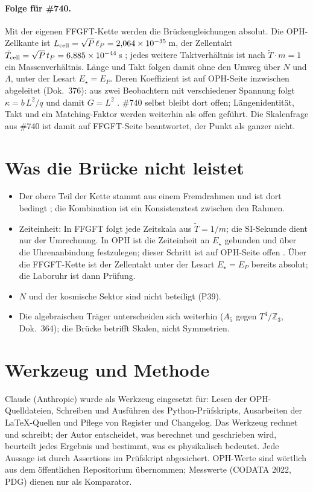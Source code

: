 \paragraph{Folge für \#740.} Mit der eigenen FFGFT-Kette werden die
Brückengleichungen absolut. Die OPH-Zellkante ist
$L_{\rm cell}=\sqrt P\,\ell_P=2{,}064\times10^{-35}$\,m, der Zellentakt
$\tilde T_{\rm cell}=\sqrt P\,t_P=6{,}885\times10^{-44}$\,s \KM; jedes weitere
Taktverhältnis ist nach $\tilde T\cdot m=1$ ein Massenverhältnis. Länge und
Takt folgen damit ohne den Umweg über $N$ und $\Lambda$, unter der Lesart
$E_\star=E_P$. Deren Koeffizient ist auf OPH-Seite inzwischen abgeleitet
(Dok.~376): aus zwei Beobachtern mit verschiedener Spannung folgt
$\kappa=b\,L^2/q$ und damit $G=L^2$ \QM. \#740 selbst bleibt dort offen;
Längenidentität, Takt und ein Matching-Faktor werden weiterhin als offen
geführt. Die Skalenfrage aus \#740 ist damit auf FFGFT-Seite beantwortet, der
Punkt als ganzer nicht.

\section{Was die Brücke nicht leistet}

\begin{itemize}\itemsep2pt
\item Der obere Teil der Kette stammt aus einem Fremdrahmen und ist dort
  bedingt \QM; die Kombination ist ein Konsistenztest zwischen den Rahmen.
\item Zeiteinheit: In FFGFT folgt jede Zeitskala aus $\tilde T=1/m$; die
  SI-Sekunde dient nur der Umrechnung. In OPH ist die Zeiteinheit an $E_\star$
  gebunden und über die Uhrenanbindung festzulegen; dieser Schritt ist auf
  OPH-Seite offen \SM. Über die FFGFT-Kette ist der Zellentakt unter der
  Lesart $E_\star=E_P$ bereits absolut; die Laboruhr ist dann Prüfung.
\item $N$ und der kosmische Sektor sind nicht beteiligt (P39).
\item Die algebraischen Träger unterscheiden sich weiterhin ($A_5$ gegen
  $T^4/\mathbb Z_3$, Dok.~364); die Brücke betrifft Skalen, nicht Symmetrien.
\end{itemize}

\section*{Werkzeug und Methode}
Claude (Anthropic) wurde als Werkzeug eingesetzt für: Lesen der
OPH-Quelldateien, Schreiben und Ausführen des Python-Prüfskripts, Ausarbeiten
der \LaTeX-Quellen und Pflege von Register und Changelog. Das Werkzeug rechnet
und schreibt; der Autor entscheidet, was berechnet und geschrieben wird,
beurteilt jedes Ergebnis und bestimmt, was es physikalisch bedeutet. Jede
Aussage ist durch Assertions im Prüfskript abgesichert. OPH-Werte sind wörtlich
aus dem öffentlichen Repositorium übernommen; Messwerte (CODATA 2022, PDG)
dienen nur als Komparator.


